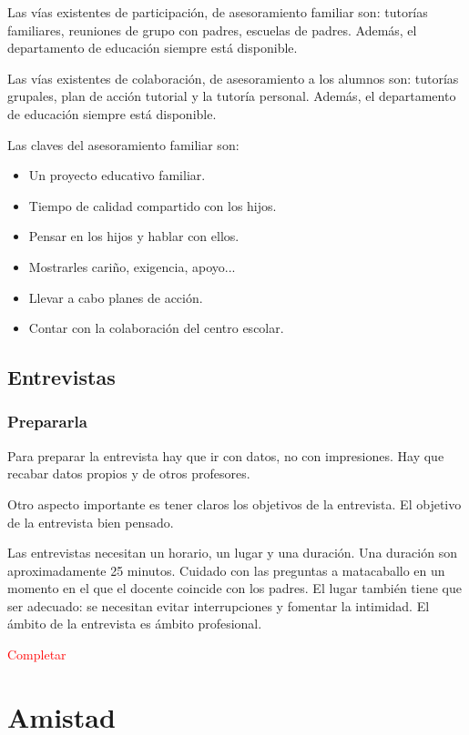 \documentclass[palatino]{apuntesURJC}
\begin{document}
Las vías existentes de participación, de asesoramiento familiar son: tutorías familiares, reuniones de grupo con padres, escuelas de padres.
%
Además, el departamento de educación siempre está disponible.

Las vías existentes de colaboración, de asesoramiento a los alumnos son: tutorías grupales, plan de acción tutorial y la tutoría personal.
%
Además, el departamento de educación siempre está disponible.


Las claves del asesoramiento familiar son:
\begin{itemize}
	\item Un proyecto educativo familiar.
	\item Tiempo de calidad compartido con los hijos.
	\item Pensar en los hijos y hablar con ellos.
	\item Mostrarles cariño, exigencia, apoyo...
	\item Llevar a cabo planes de acción.
	\item Contar con la colaboración del centro escolar.
\end{itemize}


\section{Entrevistas}

\subsection{Prepararla}

Para preparar la entrevista hay que ir con datos, no con impresiones. 
%
Hay que recabar datos propios y de otros profesores.

Otro aspecto importante es tener claros los objetivos de la entrevista.
%
El objetivo de la entrevista bien pensado.


Las entrevistas necesitan un horario, un lugar y una duración. 
%
Una duración son aproximadamente 25 minutos.
%
Cuidado con las preguntas a matacaballo en un momento en el que el docente coincide con los padres.
%
El lugar también tiene que ser adecuado: se necesitan evitar interrupciones y fomentar la intimidad.
%
El ámbito de la entrevista es ámbito profesional. 


\textcolor{red}{Completar}

\chapter{Amistad}
\end{document}
